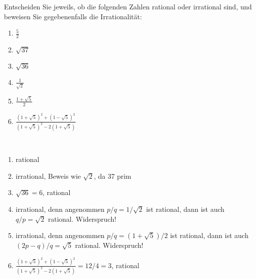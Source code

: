 \documentclass[12pt]{exam}
\begin{document}
\begin{questions}
Entscheiden Sie jeweils, ob die folgenden Zahlen rational oder irrational sind, und beweisen Sie gegebenenfalls die Irrationalität:\\
\parbox{0.5\textwidth}{\begin{enumerate}
		\item $\frac{5}{2}$ %
		\item $\sqrt{37}$   %
		\item $\sqrt{36}$   %
\end{enumerate}}\parbox{0.5\textwidth}{\begin{enumerate}\setcounter{enumi}{3}
		\item $\frac{1}{\sqrt{2}}$ %
		\item $\frac{1+\sqrt{5}}{2}$ %
		\item $\frac{(1+\sqrt{5})^2+(1-\sqrt{5})^2}{(1+\sqrt{5})^2-2(1+\sqrt{5})}$ %
\end{enumerate}}
\begin{solution}\\
	\parbox{0.5\textwidth}{\begin{enumerate}
			\item rational
			\item irrational, Beweis wie $\sqrt{2}$, da 37 prim
			\item $\sqrt{36}=6$, rational
	\end{enumerate}}\parbox{0.5\textwidth}{\begin{enumerate}\setcounter{enumi}{3}
			\item irrational, denn angenommen $p/q=1/\sqrt{2}$ ist rational, dann ist auch $q/p=\sqrt{2}$ rational. Widerspruch!
			\item irrational, denn angenommen $p/q=(1+\sqrt{5})/2$ ist rational, dann ist auch $(2p-q)/q=\sqrt{5}$ rational. Widerspruch!
			\item $\frac{(1+\sqrt{5})^2+(1-\sqrt{5})^2}{(1+\sqrt{5})^2-2(1+\sqrt{5})}=12/4=3$, rational
	\end{enumerate}}
\end{solution}





\end{questions}
\end{document}
